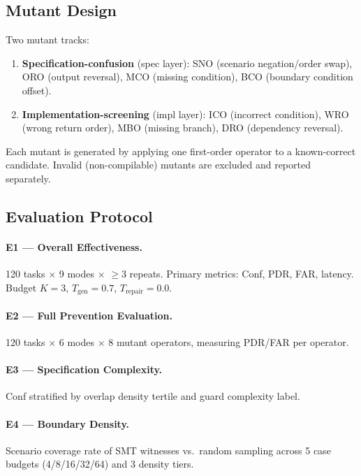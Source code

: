 \subsection{Mutant Design}

Two mutant tracks:
\begin{enumerate}
  \item \textbf{Specification-confusion} (spec layer): SNO (scenario negation/order swap),
    ORO (output reversal), MCO (missing condition), BCO (boundary condition offset).
  \item \textbf{Implementation-screening} (impl layer): ICO (incorrect condition),
    WRO (wrong return order), MBO (missing branch), DRO (dependency reversal).
\end{enumerate}
Each mutant is generated by applying one first-order operator to a known-correct
candidate.  Invalid (non-compilable) mutants are excluded and reported separately.

\subsection{Evaluation Protocol}

\paragraph{E1 — Overall Effectiveness.}
120 tasks $\times$ 9 modes $\times$ $\geq$3 repeats. Primary metrics: Conf, PDR, FAR,
latency. Budget $K=3$, $T_\text{gen}=0.7$, $T_\text{repair}=0.0$.

\paragraph{E2 — Full Prevention Evaluation.}
120 tasks $\times$ 6 modes $\times$ 8 mutant operators, measuring PDR/FAR per operator.

\paragraph{E3 — Specification Complexity.}
Conf stratified by overlap density tertile and guard complexity label.

\paragraph{E4 — Boundary Density.}
Scenario coverage rate of SMT witnesses vs.\ random sampling across 5 case budgets
(4/8/16/32/64) and 3 density tiers.

